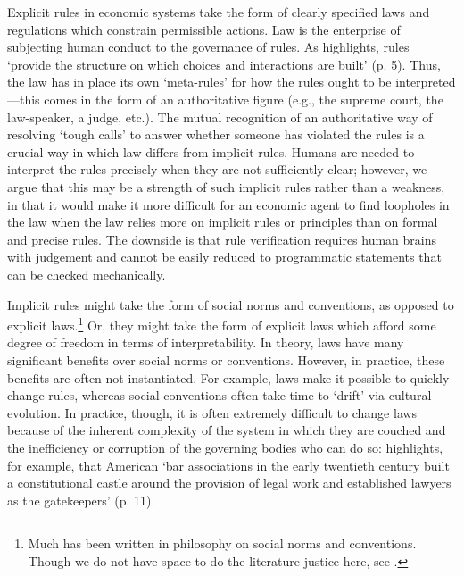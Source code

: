 \documentclass{amsart}
\theoremstyle{indented}
\theoremstyle{indentedProp}
\theoremstyle{indented}
\theoremstyle{indented}
\theoremstyle{indented}
\theoremstyle{indented}
\theoremstyle{indented}
\begin{document}
Explicit rules in economic systems take the form of clearly specified laws and regulations which constrain permissible actions. Law is the enterprise of subjecting human conduct to the governance of rules. As \citet{Hadfield-2017} highlights, rules `provide the structure on which choices and interactions are built' (p. 5). Thus, the law has in place its own `meta-rules' for how the rules ought to be interpreted---this comes in the form of an authoritative figure (e.g., the supreme court, the law-speaker, a judge, etc.). The mutual recognition of an authoritative way of resolving `tough calls' to answer whether someone has violated the rules is a crucial way in which law differs from implicit rules. Humans are needed to interpret the rules precisely when they are not sufficiently clear; however, we argue that this may be a strength of such implicit rules rather than a weakness, in that it would make it more difficult for an economic agent to find loopholes in the law when the law relies more on implicit rules or principles than on formal and precise rules. The downside is that rule verification requires human brains with judgement and cannot be easily reduced to programmatic statements that can be checked mechanically.


Implicit rules might take the form of social norms and conventions, as opposed to explicit laws.\footnote{Much has been written in philosophy on social norms and conventions. Though we do not have space to do the literature justice here, see \citet{Lewis-1969, Ullmann-Margalit-1977, Schelling-1978, Coleman-1990, Vanderschraaf-1995, Bicchieri-2006,  Young-1998, Posner-1998, Posner-2000, Voss-2001, Verbeek-2002, Southwood-Eriksson-2011}.} Or, they might take the form of explicit laws which afford some degree of freedom in terms of interpretability. In theory, laws have many significant benefits over social norms or conventions. However, in practice, these benefits are often not instantiated. For example, laws make it possible to quickly change rules, whereas social conventions often take time to `drift' via cultural evolution. In practice, though, it is often extremely difficult to change laws because of the inherent complexity of the system in which they are couched and the inefficiency or corruption of the governing bodies who can do so: \citet{Hadfield-2019} highlights, for example, that American `bar associations in the early twentieth century built a constitutional castle around the provision of legal work and established lawyers as the gatekeepers' (p. 11). 
\end{document}
